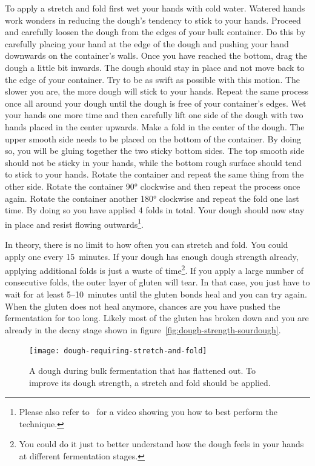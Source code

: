 To apply a stretch and fold first wet your hands with cold water. Watered hands
work wonders in reducing the dough's tendency to stick to your hands. Proceed and
carefully loosen the dough from the edges of your bulk container. Do this by
carefully placing your hand at the edge of the dough and pushing your hand
downwards on the container's walls. Once you have reached the bottom, drag the dough
a little bit inwards. The dough should stay in place and not move back to the
edge of your container. Try to be as swift as possible with this motion. The
slower you are, the more dough will stick to your hands. Repeat the same process
once all around your dough until the dough is free of your container's edges.
Wet your hands one more time and then carefully lift one side of the dough with
two hands placed in the center upwards. Make a fold in the center of the dough.
The upper smooth side needs to be placed on the bottom of the container. By doing
so, you will be gluing together the two sticky bottom sides. The top smooth side should
not be sticky in your hands, while the bottom rough surface should tend
to stick to your hands. Rotate the container
and repeat the same thing from the other side. Rotate the container 90°
clockwise and then repeat the process once again. Rotate the container another 180° clockwise
and repeat the fold one last time. By doing so you have applied 4 folds in total. Your
dough should now stay in place and resist flowing outwards\footnote{Please
also refer to~\cite{stretch+and+fold+technique} for a video showing you how to
best perform the technique.}.

In theory, there is no limit to how often you can stretch and fold. You could
apply one every 15~minutes. If your dough has enough dough strength already,
applying additional folds is just a waste of time\footnote{You could do it
just to better understand how the dough feels in your hands at different
fermentation stages.}. If you apply a large number of consecutive folds, the
outer layer of gluten
will tear. In that case, you just have to wait for at least 5--10~minutes until
the gluten bonds heal and you can try again. When the gluten does not heal
anymore, chances are you have pushed the fermentation for too long. Likely
most of the gluten has broken down and you are already
in the decay stage shown in figure~\ref{fig:dough-strength-sourdough}.

\begin{figure}[!htb]
  \texttt{[image: dough-requiring-stretch-and-fold]}
  \caption[A flattened out dough]{A dough during bulk fermentation that has
      flattened out. To improve its dough strength, a stretch and fold should
      be applied.}
\end{figure}

